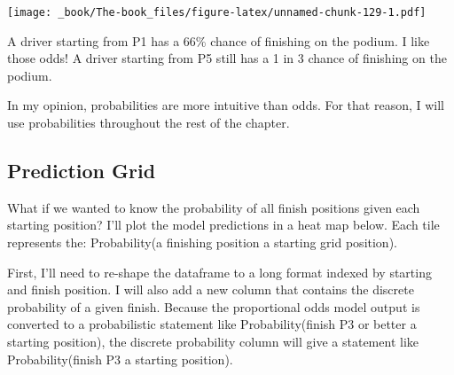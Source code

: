 \documentclass[
]{book}
\begin{document}
\texttt{[image: \_book/The-book\_files/figure-latex/unnamed-chunk-129-1.pdf]}

A driver starting from P1 has a 66\% chance of finishing on the podium. I like those odds! A driver starting from P5 still has a 1 in 3 chance of finishing on the podium.

In my opinion, probabilities are more intuitive than odds. For that reason, I will use probabilities throughout the rest of the chapter.

\hypertarget{prediction-grid}{%
\subsection{Prediction Grid}\label{prediction-grid}}

What if we wanted to know the probability of all finish positions given each starting position? I'll plot the model predictions in a heat map below. Each tile represents the: Probability(a finishing position \textbar{} a starting grid position).

First, I'll need to re-shape the dataframe to a long format indexed by starting and finish position. I will also add a new column that contains the discrete probability of a given finish. Because the proportional odds model output is converted to a probabilistic statement like Probability(finish P3 or better \textbar{} a starting position), the discrete probability column will give a statement like Probability(finish P3 \textbar{} a starting position).
\end{document}
